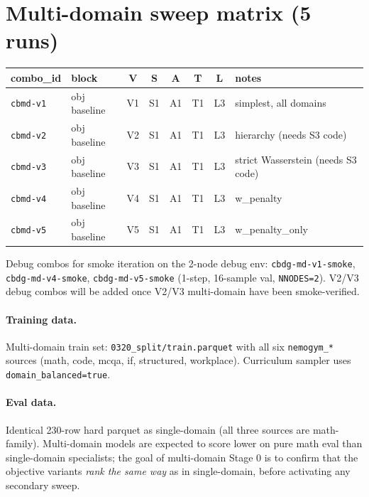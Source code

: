 \documentclass[11pt]{article}
\begin{document}
\section{Multi-domain sweep matrix (5 runs)}
\label{sec:md-matrix}

\begin{center}
\renewcommand{\arraystretch}{1.3}
\begin{tabular}{l l c c c c c l}
\toprule
combo\_id & block & V & S & A & T & L & notes \\
\midrule
\verb|cbmd-v1| & obj baseline   & V1 & S1 & A1 & T1 & L3 & simplest, all domains \\
\verb|cbmd-v2| & obj baseline   & V2 & S1 & A1 & T1 & L3 & hierarchy (needs S3 code) \\
\verb|cbmd-v3| & obj baseline   & V3 & S1 & A1 & T1 & L3 & strict Wasserstein (needs S3 code) \\
\verb|cbmd-v4| & obj baseline   & V4 & S1 & A1 & T1 & L3 & w\_penalty \\
\verb|cbmd-v5| & obj baseline   & V5 & S1 & A1 & T1 & L3 & w\_penalty\_only \\
\bottomrule
\end{tabular}
\end{center}

Debug combos for smoke iteration on the 2-node debug env:
\verb|cbdg-md-v1-smoke|, \verb|cbdg-md-v4-smoke|, \verb|cbdg-md-v5-smoke|
(1-step, 16-sample val, \texttt{NNODES=2}). V2/V3 debug combos will be
added once V2/V3 multi-domain have been smoke-verified.

\paragraph{Training data.}
Multi-domain train set: \verb|0320_split/train.parquet| with all six
\verb|nemogym_*| sources (math, code, mcqa, if, structured, workplace).
Curriculum sampler uses \verb|domain_balanced=true|.

\paragraph{Eval data.}
Identical 230-row hard parquet as single-domain (all three sources are
math-family). Multi-domain models are expected to score lower on pure
math eval than single-domain specialists; the goal of multi-domain
Stage 0 is to confirm that the objective variants \emph{rank the same
way} as in single-domain, before activating any secondary sweep.
\end{document}
